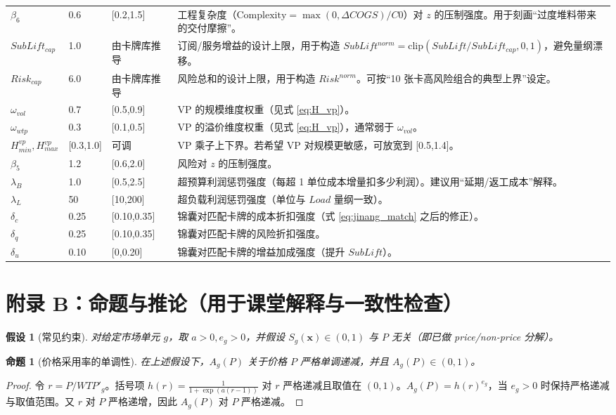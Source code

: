 \documentclass[UTF8,12pt]{ctexart}
\newtheorem{proposition}{命题}
\newtheorem{assumption}{假设}
\begin{document}
\begin{longtable}{p{}p{}p{}p{}}
$\beta_6$ & 0.6 & [0.2,1.5] & 工程复杂度（$\mathrm{Complexity}=\max(0,\Delta COGS)/C0$）对 $z$ 的压制强度。用于刻画“过度堆料带来的交付摩擦”。\\
$SubLift_{cap}$ & 1.0 & 由卡牌库推导 & 订阅/服务增益的设计上限，用于构造 $SubLift^{norm}=\mathrm{clip}(SubLift/SubLift_{cap},0,1)$，避免量纲漂移。\\
$Risk_{cap}$ & 6.0 & 由卡牌库推导 & 风险总和的设计上限，用于构造 $Risk^{norm}$。可按“10 张卡高风险组合的典型上界”设定。\\
$\omega_{vol}$ & 0.7 & [0.5,0.9] & VP 的规模维度权重（见式 \eqref{eq:H_vp}）。\\
$\omega_{wtp}$ & 0.3 & [0.1,0.5] & VP 的溢价维度权重（见式 \eqref{eq:H_vp}），通常弱于 $\omega_{vol}$。\\
$H^{vp}_{min},H^{vp}_{max}$ & [0.3,1.0] & 可调 & VP 乘子上下界。若希望 VP 对规模更敏感，可放宽到 [0.5,1.4]。\\
$\beta_5$ & 1.2 & [0.6,2.0] & 风险对 $z$ 的压制强度。\\
$\lambda_B$ & 1.0 & [0.5,2.5] & 超预算利润惩罚强度（每超 1 单位成本增量扣多少利润）。建议用“延期/返工成本”解释。\\
$\lambda_L$ & 50 & [10,200] & 超负载利润惩罚强度（单位与 $Load$ 量纲一致）。\\
$\delta_c$ & 0.25 & [0.10,0.35] & 锦囊对匹配卡牌的成本折扣强度（式 \eqref{eq:jinang_match} 之后的修正）。\\
$\delta_q$ & 0.25 & [0.10,0.35] & 锦囊对匹配卡牌的风险折扣强度。\\
$\delta_u$ & 0.10 & [0,0.20] & 锦囊对匹配卡牌的增益加成强度（提升 $SubLift$）。\\

\bottomrule
\end{longtable}

\section{附录 B：命题与推论（用于课堂解释与一致性检查）}

\begin{assumption}[常见约束]
对给定市场单元 $g$，取 $a>0,e_g>0$，并假设 $S_g(\mathbf{x})\in(0,1)$ 与 $P$ 无关（即已做 price/non-price 分解）。
\end{assumption}

\begin{proposition}[价格采用率的单调性]
在上述假设下，$A_g(P)$ 关于价格 $P$ 严格单调递减，并且 $A_g(P)\in(0,1)$。
\end{proposition}
\begin{proof}
令 $r=P/WTP'_g$。括号项 $h(r)=\frac{1}{1+\exp(a(r-1))}$ 对 $r$ 严格递减且取值在 $(0,1)$。$A_g(P)=h(r)^{e_g}$，当 $e_g>0$ 时保持严格递减与取值范围。又 $r$ 对 $P$ 严格递增，因此 $A_g(P)$ 对 $P$ 严格递减。
\end{proof}
\end{document}
